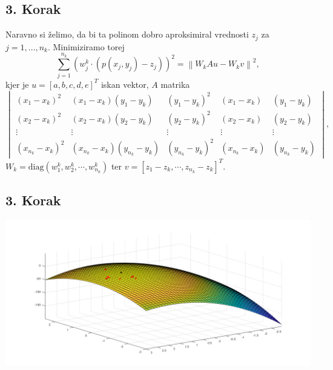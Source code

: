 \documentclass[ignorenonframetext]{beamer}
\newcommand{\norm}[1]{\left\lVert#1\right\rVert}
\let\frametitle\subsection %
\begin{document}
\begin{frame}
\frametitle{3. Korak}
Naravno si želimo, da bi ta polinom dobro aproksimiral vrednosti $z_j$ za $j = 1, \dots, n_k$. Minimiziramo torej
$$\sum_{j =1}^{n_k} (w^k_j \cdot (p(x_j,y_j) - z_j))^2 = \norm{W_kAu - W_kv}^2,$$
kjer je $u = [a,b,c,d,e]^T$ iskan vektor, $A$ matrika
\begin{equation*}
\begin{vmatrix}
(x_1 - x_k)^2 &  (x_1 - x_k) (y_1 - y_k) & (y_1 - y_k)^2 & (x_1 - x_k) & (y_1 - y_k) \\
(x_2 - x_k)^2 &  (x_2 - x_k) (y_2 - y_k) & (y_2 - y_k)^2 & (x_2 - x_k) & (y_2 - y_k) \\
\vdots & \vdots & \vdots & \vdots & \vdots \\
(x_{n_k} - x_k)^2 & (x_{n_k} - x_k) (y_{n_k} - y_k) & (y_{n_k} - y_k)^2 & (x_{n_k} - x_k) & (y_{n_k} - y_k)
\end{vmatrix},
\end{equation*}
$W_k = \text{diag}(w^k_1, w^k_2, \cdots, w^k_{n_k})$ ter $v = [z_1 - z_k, \cdots, z_{n_k} - z_k]^T$.
\end{frame}

\begin{frame}
\frametitle{3. Korak}
\includegraphics[width=\textwidth, height=\textheight]{slike/surfInterpol.png}
\end{frame}
\end{document}
